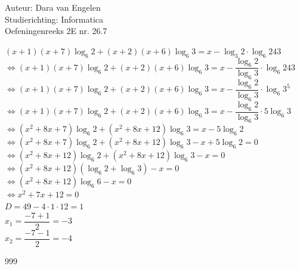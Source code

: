 \documentclass[a4paper]{article}
\begin{document}
  
\noindent \large Auteur: Dara van Engelen\\
\noindent \large Studierichting: Informatica\\
\noindent \large Oefeningenreeks 2E nr. 26.7\\

\medskip

\normalsize

$(x+1)(x+7)\log _6 2 + (x+2)(x+6)\log _6 3 = x - \log _3 2 \cdot \log _6 243$\\

$\Leftrightarrow (x+1)(x+7)\log _6 2 + (x+2)(x+6)\log _6 3 = x - \dfrac{\log _6 2}{\log _6 3} \cdot \log _6 243$\\

$\Leftrightarrow (x+1)(x+7)\log _6 2 + (x+2)(x+6)\log _6 3 = x - \dfrac{\log _6 2}{\log _6 3} \cdot \log _6 3^5$\\

$\Leftrightarrow (x+1)(x+7)\log _6 2 + (x+2)(x+6)\log _6 3 = x - \dfrac{\log _6 2}{\log _6 3} \cdot 5\log _6 3$\\

$\Leftrightarrow (x^2+8x+7)\log _6 2 + (x^2+8x+12)\log _6 3 = x - 5 \log _6 2$\\

$\Leftrightarrow (x^2+8x+7)\log _6 2 + (x^2+8x+12)\log _6 3  - x +  5 \log _6 2 = 0 $\\

$\Leftrightarrow (x^2+8x+12)\log _6 2 + (x^2+8x+12)\log _6 3  - x = 0 $\\

$\Leftrightarrow (x^2 + 8x +12)(\log _6 2 + \log _6 3) - x = 0$\\

$\Leftrightarrow (x^2 + 8x +12)\log _6 6 - x = 0$\\

$\Leftrightarrow x^2+7x+12 = 0 $\\

$D = 49 - 4\cdot1\cdot12 = 1$\\

$x_1 = \dfrac{-7+1}{2} = -3$\\

$x_2 = \dfrac{-7-1}{2} = -4$\\

\begin{thebibliography}{999}
\end{thebibliography}
\end{document}
